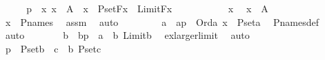 \begin{isabellebody}
\ \ \isamarkupfalse%
\ \isamarkupfalse%
\ p{}\ {\isacharcolon}{\kern0pt}\ {\isachardoublequoteopen}{\isasymAnd}x{\isachardot}{\kern0pt}\ x\ {\isasymin}\ A\ {\isasymLongrightarrow}\ x\ {\isasymin}\ P{\isacharunderscore}{\kern0pt}set{\isacharparenleft}{\kern0pt}F{\isacharparenleft}{\kern0pt}x{\isacharparenright}{\kern0pt}{\isacharparenright}{\kern0pt}\ {\isasymand}\ Limit{\isacharparenleft}{\kern0pt}F{\isacharparenleft}{\kern0pt}x{\isacharparenright}{\kern0pt}{\isacharparenright}{\kern0pt}{\isachardoublequoteclose}\isanewline
\ \ \isamarkupfalse%
\ {\isacharminus}{\kern0pt}\ \isanewline
\ \ \ \ \isamarkupfalse%
\ x\ \isamarkupfalse%
\ {\isachardoublequoteopen}x\ {\isasymin}\ A{\isachardoublequoteclose}\ \isanewline
\ \ \ \ \isamarkupfalse%
\ \isamarkupfalse%
\ {\isachardoublequoteopen}x\ {\isasymin}\ P{\isacharunderscore}{\kern0pt}names{\isachardoublequoteclose}\ \isamarkupfalse%
\ assm\ \isamarkupfalse%
\ auto\ \isanewline
\ \ \ \ \isamarkupfalse%
\ \isamarkupfalse%
\ a\ \ ap\ {\isacharcolon}{\kern0pt}\ {\isachardoublequoteopen}Ord{\isacharparenleft}{\kern0pt}a{\isacharparenright}{\kern0pt}{\isachardoublequoteclose}\ {\isachardoublequoteopen}x\ {\isasymin}\ P{\isacharunderscore}{\kern0pt}set{\isacharparenleft}{\kern0pt}a{\isacharparenright}{\kern0pt}{\isachardoublequoteclose}\ \isamarkupfalse%
\ P{\isacharunderscore}{\kern0pt}names{\isacharunderscore}{\kern0pt}def\ \isamarkupfalse%
\ auto\isanewline
\ \ \ \ \isamarkupfalse%
\ \isamarkupfalse%
\ b\ \ bp\ {\isacharcolon}{\kern0pt}\ {\isachardoublequoteopen}a\ {\isacharless}{\kern0pt}\ b{\isachardoublequoteclose}\ {\isachardoublequoteopen}Limit{\isacharparenleft}{\kern0pt}b{\isacharparenright}{\kern0pt}{\isachardoublequoteclose}\ \isamarkupfalse%
\ ex{\isacharunderscore}{\kern0pt}larger{\isacharunderscore}{\kern0pt}limit\ \isamarkupfalse%
\ auto\ \isanewline
\ \ \ \ \isamarkupfalse%
\ \isamarkupfalse%
\ p{}\ {\isacharcolon}{\kern0pt}\ {\isachardoublequoteopen}P{\isacharunderscore}{\kern0pt}set{\isacharparenleft}{\kern0pt}b{\isacharparenright}{\kern0pt}\ {\isacharequal}{\kern0pt}\ {\isacharparenleft}{\kern0pt}{\isasymUnion}c\ {\isacharless}{\kern0pt}\ b{\isachardot}{\kern0pt}\ P{\isacharunderscore}{\kern0pt}set{\isacharparenleft}{\kern0pt}c{\isacharparenright}{\kern0pt}{\isacharparenright}{\kern0pt}{\isachardoublequoteclose}\ \isamarkupfalse%

\end{isabellebody}
